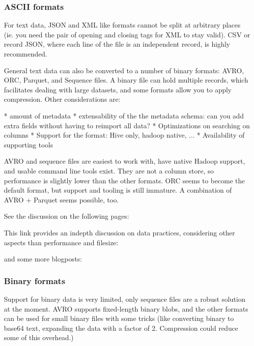 \subsubsection{ASCII formats}
For text data, JSON and XML like formats cannot be split at arbitrary places (ie. you need the pair of opening and closing tags for XML to stay valid).
CSV or record JSON, where each line of the file is an independent record, is highly recommended.

General text data can also be converted to a number of binary formats: AVRO, ORC, Parquet, and Sequence files.
A binary file can hold multiple records, which facilitates dealing with large datasets, and some formats
allow you to apply compression.
Other considerations are:

* amount of metadata
* extensability of the the metadata schema: can you add extra fields without having to reimport all data?
* Optimizations on searching on columns
* Support for the format: Hive only, hadoop native, ...
* Availability of supporting tools

AVRO and sequence files are easiest to work with, have native Hadoop support, and usable command line tools exist.
They are not a column store, so performance is slightly lower than the other formats.
ORC seems to become the default format, but support and tooling is still immature.
A combination of AVRO + Parquet seems possible, too.

See the discussion on the following pages:

This link provides an indepth discussion on data practices, considering other aspects than performance and filesize:

and some more blogposts:

\subsubsection{Binary formats}
Support for binary data is very limited, only sequence files are a robust solution at the moment.
AVRO supports fixed-length binary blobs, and the other formats can be used for small binary files with some
tricks (like converting binary to base64 text, expanding the data with a factor of 2. Compression could reduce
some of this overhead.)

